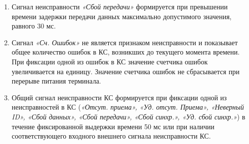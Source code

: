 \begin{enumerate}[label=\arabic{section}.\arabic{subsection}.\arabic{enumi}, labelsep=4pt, leftmargin=0pt, itemindent=57pt, itemsep=0pt, parsep=5pt]
\begin{enumerate}[label=\arabic{section}.\arabic{subsection}.\arabic{enumi}.\arabic*, labelsep=4pt, leftmargin=0em, itemindent=65pt, parsep=0pt]
\item
Сигнал неисправности \textit{«Сбой передачи»} формируется при превышении времени задержки передачи данных максимально допустимого значения, равного 30 мс.

\item
Сигнал \textit{«Сч. Ошибок»} не является признаком неисправности и показывает общее количество ошибок в КС, возникших до текущего момента времени.
При фиксации одной из ошибок в КС значение счетчика ошибок увеличивается на единицу.
Значение счетчика ошибок не сбрасывается при перерыве питания терминала.

\item
Общий сигнал неисправности КС формируется при фиксации одной из неисправностей в КС (\textit{«Отсут. приема», «Уд. отсут. Приема», «Неверный ID», «Сбой данных», «Сбой передачи», «Сбой синхр.», «Уд. сбой синхр.»}) в течение фиксированной выдержки времени 50 мс или при наличии соответствующего входного внешнего сигнала неисправности КС.

\end{enumerate}


\end{enumerate}
